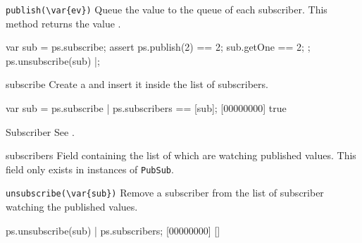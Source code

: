 \begin{urbiscriptapi}

\item \lstinline|publish(\var{ev})|
  Queue the value  to the queue of each subscriber.  This method
  returns the value .

\begin{urbiscript}
{
  var sub = ps.subscribe;
  assert
  {
    ps.publish(2) == 2;
    sub.getOne == 2;
  };
  ps.unsubscribe(sub)
}|;
\end{urbiscript}

\item[subscribe]
  Create a  and insert it inside the list of
  subscribers.

\begin{urbiscript}
var sub = ps.subscribe |
ps.subscribers == [sub];
[00000000] true
\end{urbiscript}

\item[Subscriber] See .

\item[subscribers]
  Field containing the list of  which are
  watching published values.  This field only exists in instances of
  \lstinline|PubSub|.

\item \lstinline|unsubscribe(\var{sub})|
  Remove a subscriber from the list of subscriber watching the published
  values.

\begin{urbiscript}
ps.unsubscribe(sub) |
ps.subscribers;
[00000000] []
\end{urbiscript}


\end{urbiscriptapi}

